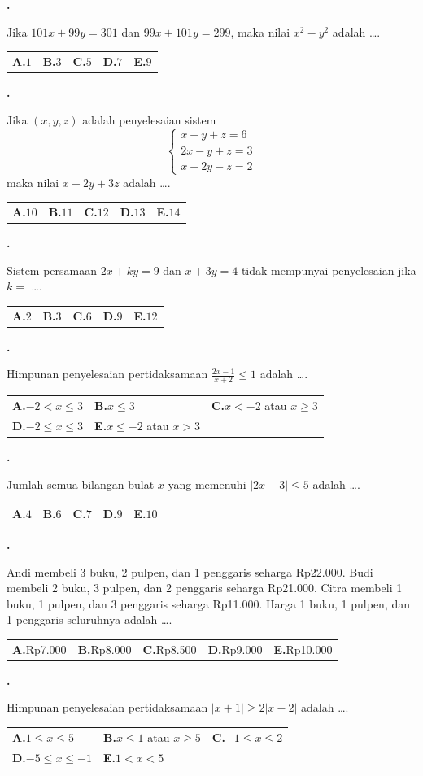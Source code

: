 \documentclass[a4paper,11pt]{article}
\newcommand{\dis}{\displaystyle}
\newcounter{no}
\newcommand{\soal}[2]{\par\vspace{0.75em}\stepcounter{no}\noindent
  \begin{minipage}[t]{1.8em}\textbf{\theno.}\end{minipage}%
  \begin{minipage}[t]{\dimexpr\linewidth-1.8em\relax}#1\par\vspace{0.35em}#2\end{minipage}\par}
\begin{document}
\soal{Jika $101x+99y=301$ dan $99x+101y=299$, maka nilai $x^{2}-y^{2}$ adalah \dots.}{\begin{tabularx}{\linewidth}{@{}*{5}{X}@{}}\textbf{A.}\;$1$ & \textbf{B.}\;$3$ & \textbf{C.}\;$5$ & \textbf{D.}\;$7$ & \textbf{E.}\;$9$\end{tabularx}}
\soal{Jika $(x,y,z)$ adalah penyelesaian sistem \[\begin{cases}x+y+z=6\\ 2x-y+z=3\\ x+2y-z=2\end{cases}\] maka nilai $x+2y+3z$ adalah \dots.}{\begin{tabularx}{\linewidth}{@{}*{5}{X}@{}}\textbf{A.}\;$10$ & \textbf{B.}\;$11$ & \textbf{C.}\;$12$ & \textbf{D.}\;$13$ & \textbf{E.}\;$14$\end{tabularx}}
\soal{Sistem persamaan $2x+ky=9$ dan $x+3y=4$ tidak mempunyai penyelesaian jika $k=$ \dots.}{\begin{tabularx}{\linewidth}{@{}*{5}{X}@{}}\textbf{A.}\;$2$ & \textbf{B.}\;$3$ & \textbf{C.}\;$6$ & \textbf{D.}\;$9$ & \textbf{E.}\;$12$\end{tabularx}}
\soal{Himpunan penyelesaian pertidaksamaan $\dis\frac{2x-1}{x+2}\le1$ adalah \dots.}{\begin{tabularx}{\linewidth}{@{}*{3}{X}@{}}\textbf{A.}\;$-2<x\le3$ & \textbf{B.}\;$x\le3$ & \textbf{C.}\;$x<-2$ atau $x\ge3$\\[3pt] \textbf{D.}\;$-2\le x\le3$ & \textbf{E.}\;$x\le-2$ atau $x>3$ & \end{tabularx}}
\soal{Jumlah semua bilangan bulat $x$ yang memenuhi $|2x-3|\le5$ adalah \dots.}{\begin{tabularx}{\linewidth}{@{}*{5}{X}@{}}\textbf{A.}\;$4$ & \textbf{B.}\;$6$ & \textbf{C.}\;$7$ & \textbf{D.}\;$9$ & \textbf{E.}\;$10$\end{tabularx}}
\soal{Andi membeli 3 buku, 2 pulpen, dan 1 penggaris seharga Rp22.000. Budi membeli 2 buku, 3 pulpen, dan 2 penggaris seharga Rp21.000. Citra membeli 1 buku, 1 pulpen, dan 3 penggaris seharga Rp11.000. Harga 1 buku, 1 pulpen, dan 1 penggaris seluruhnya adalah \dots.}{\begin{tabularx}{\linewidth}{@{}*{5}{X}@{}}\textbf{A.}\;Rp7.000 & \textbf{B.}\;Rp8.000 & \textbf{C.}\;Rp8.500 & \textbf{D.}\;Rp9.000 & \textbf{E.}\;Rp10.000\end{tabularx}}
\soal{Himpunan penyelesaian pertidaksamaan $|x+1|\ge2|x-2|$ adalah \dots.}{\begin{tabularx}{\linewidth}{@{}*{3}{X}@{}}\textbf{A.}\;$1\le x\le5$ & \textbf{B.}\;$x\le1$ atau $x\ge5$ & \textbf{C.}\;$-1\le x\le2$\\[3pt] \textbf{D.}\;$-5\le x\le-1$ & \textbf{E.}\;$1<x<5$ & \end{tabularx}}
\end{document}
